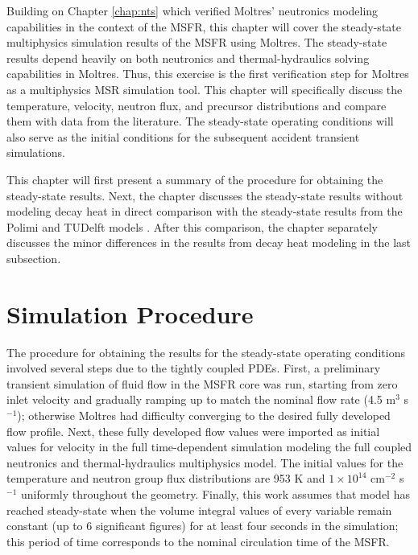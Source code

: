 Building on Chapter \ref{chap:nts} which verified Moltres' neutronics modeling
capabilities in the context of the \gls{MSFR}, this chapter will cover the
steady-state multiphysics simulation results of the \gls{MSFR} using Moltres.
The steady-state results depend heavily on both neutronics and
thermal-hydraulics solving capabilities in Moltres. Thus, this exercise is the
first verification step for Moltres as a multiphysics \gls{MSR} simulation
tool. This chapter will specifically discuss the temperature, velocity,
neutron flux, and precursor distributions and compare them with data from the
literature. The steady-state operating conditions will also serve as the
initial conditions for the subsequent accident transient simulations.

This chapter will first
present a summary of the procedure for obtaining the steady-state results.
Next, the chapter discusses the steady-state results without modeling decay
heat in direct comparison with the steady-state results from the Polimi and
TUDelft models \cite{aufiero_development_2014}. After this
comparison, the chapter separately discusses the minor differences in the
results from decay heat modeling in the last subsection.

\section{Simulation Procedure}

The procedure for obtaining the results for the steady-state operating
conditions involved several steps
due to the tightly coupled \glspl{PDE}. First, a preliminary transient
simulation of fluid flow in the \gls{MSFR} core was run, starting from zero
inlet velocity and gradually ramping up to match the nominal flow rate (4.5
m$^3$ s$^{-1}$); otherwise Moltres had difficulty converging to the desired
fully developed flow profile.
Next, these fully developed flow values were imported as initial values for
velocity in the full time-dependent simulation modeling the full coupled
neutronics and thermal-hydraulics multiphysics model. The initial values for
the temperature and neutron group flux distributions are 953 K and
$1 \times 10^{14}$ cm$^{-2}$ s$^{-1}$ uniformly throughout the geometry.
Finally, this work assumes that model has reached steady-state when the volume
integral values of every variable remain constant (up to 6 significant
figures) for at least four seconds in the simulation; this
period of time corresponds to the nominal circulation time of the \gls{MSFR}.

